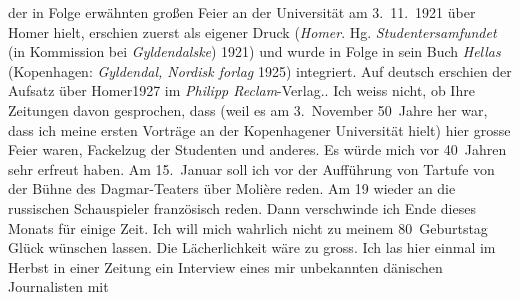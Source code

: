 \begin{ledgroupsized}[t]{13cm}
{{{                  der in Folge erwähnten großen Feier an der Universität am 3. 11. 1921 über Homer hielt, erschien zuerst als eigener
                  Druck (\emph{Homer}. Hg. \emph{Studentersamfundet} (in Kommission bei
                        \emph{Gyldendalske}) 1921) und wurde in Folge in sein Buch \emph{Hellas} (Kopenhagen: \emph{Gyldendal, Nordisk
                        forlag}{ }1925) integriert. Auf deutsch erschien der Aufsatz über Homer1927 im \emph{Philipp
                  Reclam}-Verlag.}}}\label{K_L02373-1h}.\pend
           \pstart
           Ich weiss nicht, ob Ihre Zeitungen davon gesprochen, dass (weil es am
                  3. November 50 Jahre her war, dass ich meine ersten Vorträge an der
                  Kopenhagener Universität hielt) hier grosse
               Feier waren, Fackelzug der Studenten {\pb}und anderes. Es würde mich vor
               40 Jahren sehr erfreut haben.\pend
           \pstart
           Am 15. Januar soll ich vor der Aufführung von Tartufe von der Bühne des Dagmar-Teaters über Molière reden. Am
                  19 wieder an die russischen
               Schauspieler französisch reden.\pend
           \pstart
           Dann verschwinde ich Ende dieses Monats für einige Zeit. Ich will mich wahrlich nicht
               zu meinem 80 Geburtstag Glück wünschen lassen. Die Lächerlichkeit wäre zu gross.\pend
           \pstart
           Ich las hier einmal im Herbst in einer Zeitung ein Interview eines mir unbekannten { }dänischen Journalisten mit

\end{ledgroupsized}
